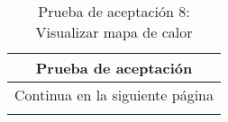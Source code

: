 \begin{longtable}{|p{6.7cm}|p{6.7cm}|}
    \caption{Prueba de aceptación 8: Visualizar mapa de calor} \label{tab:prueba-8}
    \\
    \hline
    \multicolumn{2}{|c|}{\textbf{Prueba de aceptación}}                                                                                                                                                                                                                                                                             \\
    \hline

    \endfirsthead

    \hline
    \endhead

    \hline
    \multicolumn{2}{|c|}{{Continua en la siguiente página}}                                                                                                                                                                                                                                                                         \\
    \hline
    \endfoot


\end{longtable}
